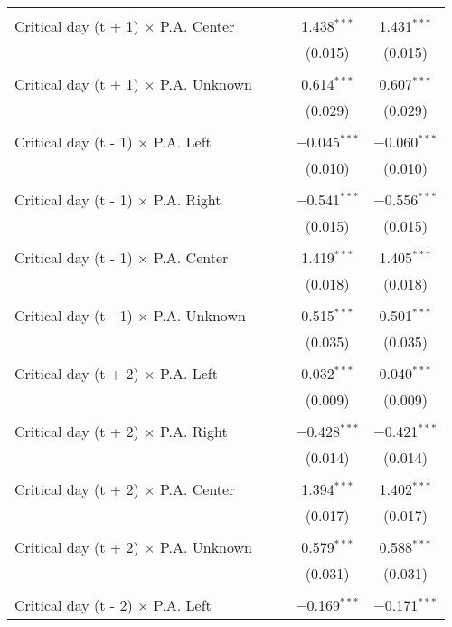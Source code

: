 \documentclass[
]{article}
\begin{document}
\begin{table}[!htbp]
{\begin{tabular}{@{\extracolsep{5pt}}lcccc}
  & & & & \\ 
 Critical day (t + 1) $\times$ P.A. Center &  &  & 1.438$^{***}$ & 1.431$^{***}$ \\ 
  &  &  & (0.015) & (0.015) \\ 
  & & & & \\ 
 Critical day (t + 1) $\times$ P.A. Unknown &  &  & 0.614$^{***}$ & 0.607$^{***}$ \\ 
  &  &  & (0.029) & (0.029) \\ 
  & & & & \\ 
 Critical day (t - 1) $\times$ P.A. Left &  &  & $-$0.045$^{***}$ & $-$0.060$^{***}$ \\ 
  &  &  & (0.010) & (0.010) \\ 
  & & & & \\ 
 Critical day (t - 1) $\times$ P.A. Right &  &  & $-$0.541$^{***}$ & $-$0.556$^{***}$ \\ 
  &  &  & (0.015) & (0.015) \\ 
  & & & & \\ 
 Critical day (t - 1) $\times$ P.A. Center &  &  & 1.419$^{***}$ & 1.405$^{***}$ \\ 
  &  &  & (0.018) & (0.018) \\ 
  & & & & \\ 
 Critical day (t - 1) $\times$ P.A. Unknown &  &  & 0.515$^{***}$ & 0.501$^{***}$ \\ 
  &  &  & (0.035) & (0.035) \\ 
  & & & & \\ 
 Critical day (t + 2) $\times$ P.A. Left &  &  & 0.032$^{***}$ & 0.040$^{***}$ \\ 
  &  &  & (0.009) & (0.009) \\ 
  & & & & \\ 
 Critical day (t + 2) $\times$ P.A. Right &  &  & $-$0.428$^{***}$ & $-$0.421$^{***}$ \\ 
  &  &  & (0.014) & (0.014) \\ 
  & & & & \\ 
 Critical day (t + 2) $\times$ P.A. Center &  &  & 1.394$^{***}$ & 1.402$^{***}$ \\ 
  &  &  & (0.017) & (0.017) \\ 
  & & & & \\ 
 Critical day (t + 2) $\times$ P.A. Unknown &  &  & 0.579$^{***}$ & 0.588$^{***}$ \\ 
  &  &  & (0.031) & (0.031) \\ 
  & & & & \\ 
 Critical day (t - 2) $\times$ P.A. Left &  &  & $-$0.169$^{***}$ & $-$0.171$^{***}$ \\ 

\end{tabular}}
\end{table}
\end{document}
